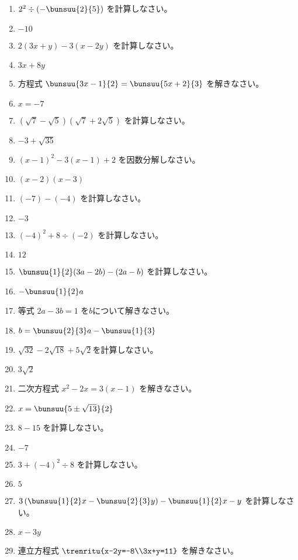 \documentclass[uplatex,a4j,11pt]{jsreport}
\begin{document}
\begin{multicols}{2}
\begin{enumerate}
    \item $2^2\div\left(-\bunsuu{2}{5}\right)$ を計算しなさい。%
    \item $-10$
    \item $2(3x+y)-3(x-2y)$ を計算しなさい。%
    \item $3x+8y$
    \item 方程式 $\bunsuu{3x-1}{2}=\bunsuu{5x+2}{3}$ を解きなさい。%
    \item $x=-7$
    \item $(\sqrt{7}-\sqrt{5})(\sqrt{7}+2\sqrt{5})$ を計算しなさい。%
    \item $-3+\sqrt{35}$
    \item $(x-1)^2-3(x-1)+2$ を因数分解しなさい。%
    \item $(x-2)(x-3)$
    \item $(-7)-(-4)$ を計算しなさい。%
    \item $-3$
    \item $(-4)^2+8\div(-2)$ を計算しなさい。%
    \item $12$
    \item $\bunsuu{1}{2}(3a-2b)-(2a-b)$ を計算しなさい。%
    \item $-\bunsuu{1}{2}a$
    \item 等式 $2a-3b=1$ を$b$について解きなさい。%
    \item $b=\bunsuu{2}{3}a-\bunsuu{1}{3}$
    \item $\sqrt{32}-2\sqrt{18}+5\sqrt{2}$を計算しなさい。%
    \item $3\sqrt{2}$
    \item 二次方程式 $x^2-2x=3(x-1)$ を解きなさい。%
    \item $x=\bunsuu{5\pm\sqrt{13}}{2}$
    \item $8-15$ を計算しなさい。%
    \item $-7$
    \item $3+(-4)^2\div8$ を計算しなさい。%
    \item $5$
    \item $3\left(\bunsuu{1}{2}x-\bunsuu{2}{3}y\right)-\bunsuu{1}{2}x-y$ を計算しなさい。%
    \item $x-3y$
    \item 連立方程式 $\trenritu{x-2y=-8\\3x+y=11}$ を解きなさい。%

\end{enumerate}
\end{multicols}
\end{document}
